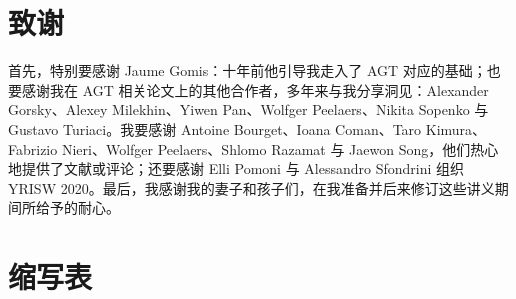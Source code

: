 \section*{致谢}

首先，特别要感谢 Jaume Gomis：十年前他引导我走入了 AGT 对应的基础；也要感谢我在 AGT 相关论文上的其他合作者，多年来与我分享洞见：Alexander Gorsky、Alexey Milekhin、Yiwen Pan、Wolfger Peelaers、Nikita Sopenko 与 Gustavo Turiaci。我要感谢 Antoine Bourget、Ioana Coman、Taro Kimura、Fabrizio Nieri、Wolfger Peelaers、Shlomo Razamat 与 Jaewon Song，他们热心地提供了文献或评论；还要感谢 Elli Pomoni 与 Alessandro Sfondrini 组织 YRISW 2020。最后，我感谢我的妻子和孩子们，在我准备并后来修订这些讲义期间所给予的耐心。

\section*{缩写表}


